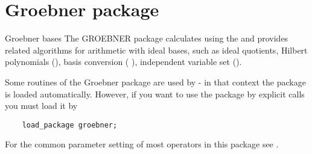 \newpage
\section{Groebner package}
\begin{Introduction}{Groebner bases}
The GROEBNER package calculates  using the
 and provides related algorithms
for arithmetic with ideal bases, such as ideal quotients,
Hilbert polynomials (), 
basis conversion (
), independent  
variable set ().



Some routines of the Groebner package are used by  - in
that context the package is loaded automatically. However, if you
want to use the package by explicit calls you must load it by
\begin{verbatim}
    load_package groebner;
\end{verbatim}

For the common parameter setting of most operators in this package 
see .
\end{Introduction}



